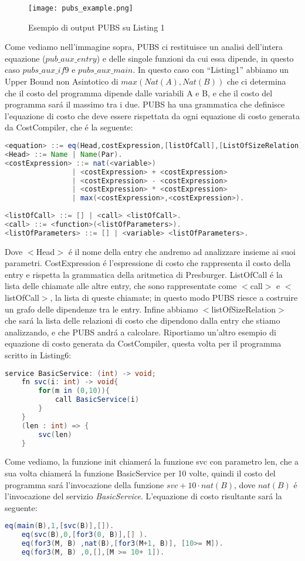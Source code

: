 \documentclass[../../main.tex]{subfiles}
\begin{document}
\begin{figure}[H]
    \centering
    \texttt{[image: pubs\_example.png]}
    \caption{Esempio di output PUBS su Listing 1}
\end{figure}
Come vediamo nell'immagine sopra, PUBS ci restituisce un analisi dell'intera equazione ($pub\_aux\_entry$) e delle singole funzioni da cui essa dipende, in questo caso $pubs\_aux\_if9$ e $pubs\_aux\_main$.
In questo caso con ``Listing1'' abbiamo un Upper Bound non Asintotico di $max(Nat(A), Nat(B))$ che ci determina che il costo del programma dipende dalle variabili A e B, e che il costo del programma sará il massimo tra i due.
PUBS ha una grammatica che definisce l'equazione di costo che deve essere rispettata da ogni equazione di costo generata da CostCompiler, che é la seguente:
\begin{lstlisting}[language=Java, caption={Grammatica PUBS}]
<equation> ::= eq(Head,costExpression,[listOfCall],[ListOfSizeRelation]).
<Head> ::= Name | Name(Par).
<costExpression> ::= nat(<variable>) 
                | <costExpression> + <costExpression> 
                | <costExpression> - <costExpression> 
                | <costExpression> * <costExpression> 
                | max(<costExpression>,<costExpression>).
                
<listOfCall> ::= [] | <call> <listOfCall>.
<call> ::= <function>(<listOfParameters>).
<listOfParameters> ::= [] | <variable> <listOfParameters>.
\end{lstlisting}
Dove $<$Head$>$ é il nome della entry che andremo ad analizzare insieme ai suoi parametri.
CostExpression é l'espressione di costo che rappresenta il costo della entry e rispetta la grammatica della aritmetica di Presburger.
ListOfCall é la lista delle chiamate alle altre entry, che sono rappresentate come $<$call$>$ e $<$listOfCall$>$, la lista di queste chiamate; in questo modo PUBS riesce a costruire un grafo delle dipendenze tra le entry.
Infine abbiamo $<$listOfSizeRelation$>$ che sará la lista delle relazioni di costo che dipendono dalla entry che stiamo analizzando, e che PUBS andrá a calcolare.
Riportiamo un'altro esempio di equazione di costo generata da CostCompiler, questa volta per il programma scritto in Listing6:
\begin{lstlisting}[caption={Listing 6}, language=Java]
    service BasicService: (int) -> void;
    fn svc(i: int) -> void{
        for(m in (0,10)){
            call BasicService(i)
        }
    }
    (len : int) => {
        svc(len)
    }
\end{lstlisting}
Come vediamo, la funzione init chiamerá la funzione svc con parametro len, che a sua volta chiamerá la funzione BasicService per 10 volte, quindi il costo del programma sará l'invocazione della funzione $svc + 10 \cdot nat(B)$, dove $nat(B)$ é l'invocazione del servizio \textit{BasicService}.
L'equazione di costo risultante sará la seguente:
\begin{lstlisting}[language=Java,caption={Equazione di costo PUBS per Listing6}]
    eq(main(B),1,[svc(B)],[]).
    eq(svc(B),0,[for3(0, B)],[] ).
    eq(for3(M, B) ,nat(B),[for3(M+1, B)], [10>= M]).
    eq(for3(M, B) ,0,[],[M >= 10+ 1]).
\end{lstlisting}
\end{document}
